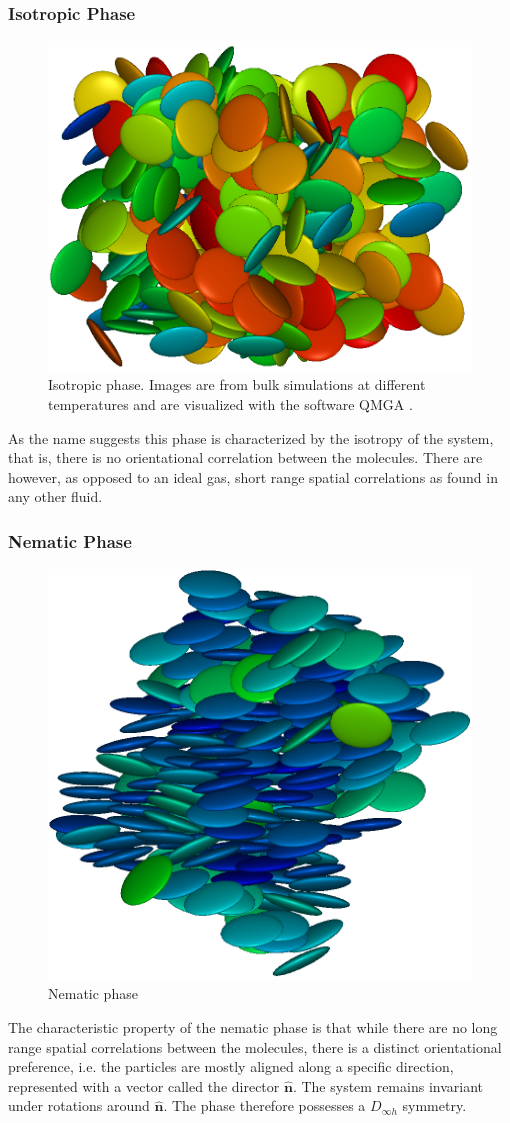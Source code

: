 \subsubsection{Isotropic Phase}
\begin{figure}[H]
 \centering
 \includegraphics[width=.3\linewidth]{images/isotropic.png}
 \caption{Isotropic phase. Images are from bulk simulations at different temperatures and are visualized with the software QMGA \cite{qmga}.}
 \label{fig:isotropic}
\end{figure}

As the name suggests this phase is characterized by the isotropy of the system, that is, there is no orientational correlation between the molecules. There are however, as opposed to an ideal gas, short range spatial correlations as found in any other fluid.
\subsubsection{Nematic Phase}
\begin{figure}[H]
 \centering
 \includegraphics[width=.3\linewidth]{images/nematic.png}
 \caption{Nematic phase}
 \label{fig:nematic}
\end{figure}
The characteristic property of the nematic phase is that while there are no long range spatial correlations between the molecules, there is a distinct orientational preference, i.e. the particles are mostly aligned along a specific direction, represented with a vector called the director $\hat{\mathbf{n}}$. The system remains invariant under rotations around $\hat{\mathbf{n}}$. The phase therefore possesses a $D_{\infty h}$ symmetry.
